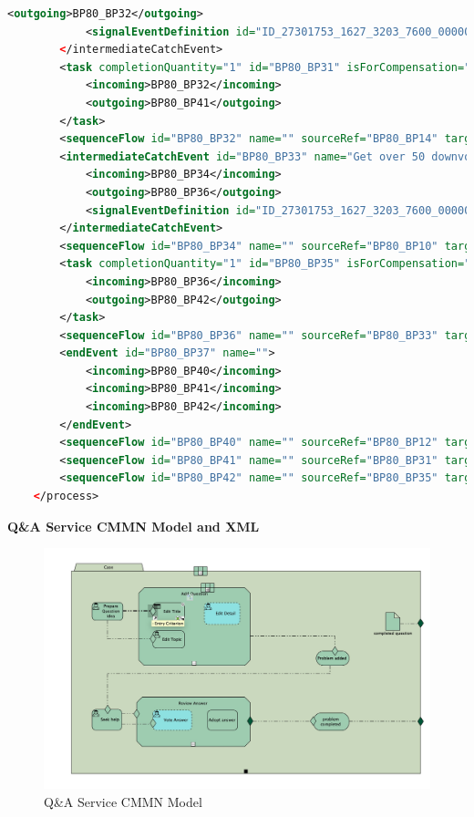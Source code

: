 \documentclass[runningheads]{llncs}
\begin{document}
\begin{lstlisting}[language={XML}]
			<outgoing>BP80_BP32</outgoing>
			<signalEventDefinition id="ID_27301753_1627_3203_7600_000000200122" />
		</intermediateCatchEvent>
		<task completionQuantity="1" id="BP80_BP31" isForCompensation="false" name="Receive award" startQuantity="1">
			<incoming>BP80_BP32</incoming>
			<outgoing>BP80_BP41</outgoing>
		</task>
		<sequenceFlow id="BP80_BP32" name="" sourceRef="BP80_BP14" targetRef="BP80_BP31" />
		<intermediateCatchEvent id="BP80_BP33" name="Get over 50 downvoted">
			<incoming>BP80_BP34</incoming>
			<outgoing>BP80_BP36</outgoing>
			<signalEventDefinition id="ID_27301753_1627_3203_7600_000000200123" />
		</intermediateCatchEvent>
		<sequenceFlow id="BP80_BP34" name="" sourceRef="BP80_BP10" targetRef="BP80_BP33" />
		<task completionQuantity="1" id="BP80_BP35" isForCompensation="false" name="Edit answer" startQuantity="1">
			<incoming>BP80_BP36</incoming>
			<outgoing>BP80_BP42</outgoing>
		</task>
		<sequenceFlow id="BP80_BP36" name="" sourceRef="BP80_BP33" targetRef="BP80_BP35" />
		<endEvent id="BP80_BP37" name="">
			<incoming>BP80_BP40</incoming>
			<incoming>BP80_BP41</incoming>
			<incoming>BP80_BP42</incoming>
		</endEvent>
		<sequenceFlow id="BP80_BP40" name="" sourceRef="BP80_BP12" targetRef="BP80_BP37" />
		<sequenceFlow id="BP80_BP41" name="" sourceRef="BP80_BP31" targetRef="BP80_BP37" />
		<sequenceFlow id="BP80_BP42" name="" sourceRef="BP80_BP35" targetRef="BP80_BP37" />
	</process>
	\end{lstlisting}

	\textbf{Q\&A Service CMMN Model and XML}\\
	\begin{figure}
		\centering %
		\includegraphics[width=1.0\textwidth]{figure/mwzh/cmmnmodel} %
		\caption{Q\&A Service CMMN Model} %
		\label{qaservice} %
    \end{figure}   
    
\end{document}
